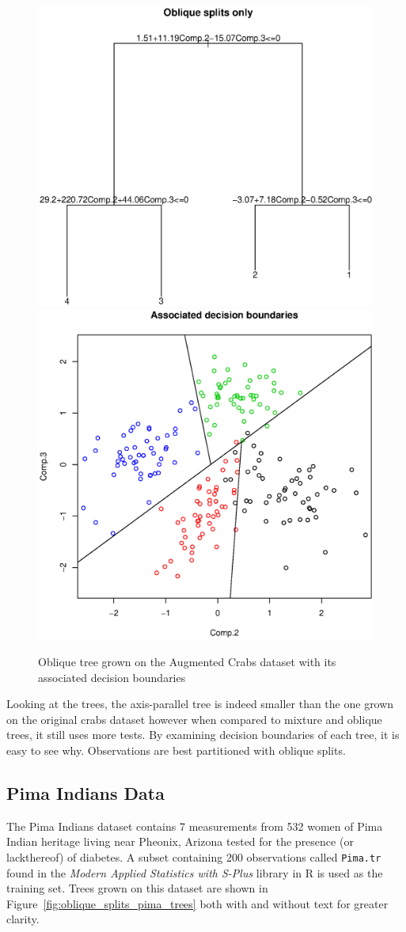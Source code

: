 \begin{figure}
\centering
\includegraphics[width=.4\textwidth]{oblique_splits_crabs_augmented_only_tree.ps}
\includegraphics[width=.4\textwidth]{oblique_splits_crabs_augmented_only_decision_boundaries.ps}
\caption{Oblique tree grown on the Augmented Crabs dataset with its associated decision boundaries}
\label{fig:oblique_splits_crabs_augmented_only}
\end{figure}

Looking at the trees, the axis-parallel tree is indeed smaller than the one grown on the original crabs dataset however when compared to mixture and oblique trees, it still uses more tests. By examining decision boundaries of each tree, it is easy to see why. Observations are best partitioned with oblique splits.

\subsection{Pima Indians Data}
\label{PimaIndiansData}
The Pima Indians dataset contains 7 measurements from 532 women of Pima Indian heritage living near Pheonix, Arizona tested for the presence (or lackthereof) of diabetes. A subset containing 200 observations called \texttt{Pima.tr} found in the \emph{Modern Applied Statistics with S-Plus} library in R is used as the training set. Trees grown on this dataset are shown in Figure~\ref{fig:oblique_splits_pima_trees} both with and without text for greater clarity.\\

